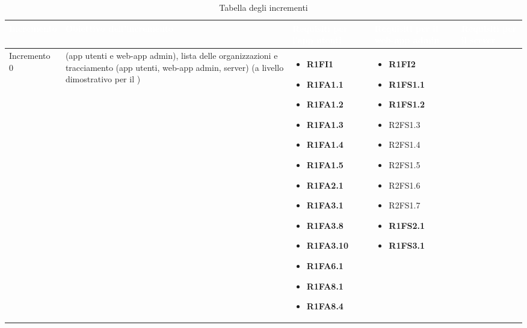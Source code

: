 {
\renewcommand{\arraystretch}{2}
\centering
	
\begin{longtable}{C{2.5cm} C{3.2cm} C{2.8cm} C{2.8cm} C{2.8cm}}
\caption{Tabella degli incrementi}\\
\textcolor{white}{\textbf{Incremento}} &
\textcolor{white}{\textbf{Obiettivo dell'incremento}} & 
\textcolor{white}{\textbf{Requisiti per l'app utenti}} &
\textcolor{white}{\textbf{Requisiti per il web-app admin}} &
\textcolor{white}{\textbf{Requisiti per il server}} \\
\endhead

Incremento 0 &  (app utenti e web-app admin), lista delle organizzazioni e tracciamento (app utenti, web-app admin, server) (a livello dimostrativo per il ) & \begin{itemize}
    \item[ ] \textbf{R1FI1}
    \item[ ] \textbf{R1FA1.1}
    \item[ ] \textbf{R1FA1.2}
    \item[ ] \textbf{R1FA1.3}
    \item[ ] \textbf{R1FA1.4}
    \item[ ] \textbf{R1FA1.5}
    \item[ ] \textbf{R1FA2.1}
    \item[ ] \textbf{R1FA3.1}
    \item[ ] \textbf{R1FA3.8}
    \item[ ] \textbf{R1FA3.10}
    \item[ ] \textbf{R1FA6.1}
    \item[ ] \textbf{R1FA8.1}
    \item[ ] \textbf{R1FA8.4} 
\end{itemize} & \begin{itemize}
    \item[ ] \textbf{R1FI2}
    \item[ ] \textbf{R1FS1.1}
    \item[ ] \textbf{R1FS1.2}
    \item[ ] R2FS1.3
    \item[ ] R2FS1.4
    \item[ ] R2FS1.5
    \item[ ] R2FS1.6
    \item[ ] R2FS1.7
    \item[ ] \textbf{R1FS2.1}
    \item[ ] \textbf{R1FS3.1}

\end{itemize}
\end{longtable}}
